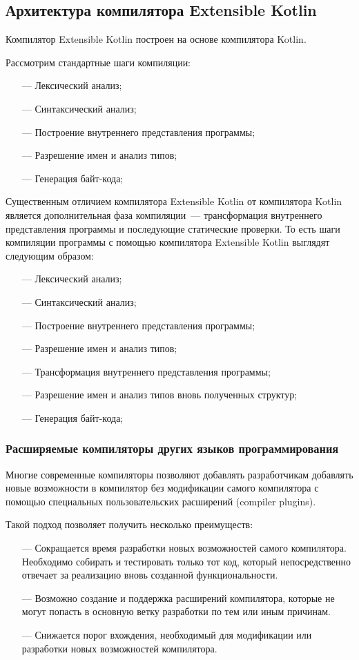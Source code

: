 \subsection{Архитектура компилятора Extensible Kotlin}\label{architecture}
Компилятор Extensible Kotlin построен на основе компилятора Kotlin.

Рассмотрим стандартные шаги компиляции:
\begin{itemize}
\item[---] Лексический анализ;
\item[---] Синтаксический анализ;
\item[---] Построение внутреннего представления программы;
\item[---] Разрешение имен и анализ типов;
\item[---] Генерация байт-кода;
\end{itemize}

Существенным отличием компилятора Extensible Kotlin от компилятора Kotlin является дополнительная фаза компиляции~--- трансформация внутреннего представления программы  и последующие статические проверки. То есть шаги компиляции программы с помощью компилятора Extensible Kotlin выглядят следующим образом:
\begin{itemize}
\item[---] Лексический анализ;
\item[---] Синтаксический анализ;
\item[---] Построение внутреннего представления программы;
\item[---] Разрешение имен и анализ типов;
\item[---] Трансформация внутреннего представления программы;
\item[---] Разрешение имен и анализ типов вновь полученных структур;
\item[---] Генерация байт-кода;
\end{itemize}

\subsubsection{Расширяемые компиляторы других языков программирования}
Многие современные компиляторы позволяют добавлять разработчикам добавлять новые возможности в компилятор без модификации самого компилятора с помощью специальных пользовательских расширений (compiler plugins).

Такой подход позволяет получить несколько преимуществ:
\begin{itemize}
\item[---] Сокращается время разработки новых возможностей самого компилятора. Необходимо собирать и тестировать только тот код, который непосредственно отвечает за реализацию вновь созданной функциональности.
\item[---] Возможно создание и поддержка расширений компилятора, которые не могут попасть в основную ветку разработки по тем или иным причинам.
\item[---] Снижается порог вхождения, необходимый для модификации или разработки новых возможностей компилятора.
\end{itemize}

